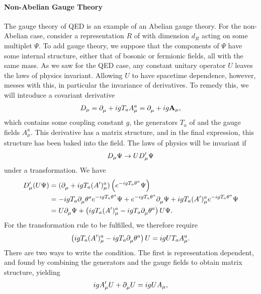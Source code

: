 \paragraph{Non-Abelian Gauge Theory}
The gauge theory of QED is an example of an Abelian gauge theory. For the non-Abelian case, consider a representation $R$ of  with dimension $d_{R}$ acting on some multiplet $\Psi$. To add gauge theory, we suppose that the components of $\Psi$ have some internal structure, either that of bosonic or fermionic fields, all with the same mass. As we saw for the QED case, any constant unitary operator $U$ leaves the laws of physics invariant. Allowing $U$ to have spacetime dependence, however, messes with this, in particular the invariance of derivatives. To remedy this, we will introduce a covariant derivative
\begin{align*}
	D_{\mu} = \partial^{}_{\mu} + igT_{a}A_{\mu}^{a} = \partial^{}_{\mu} + ig\textbf{A}_{\mu},
\end{align*}
which contains some coupling constant $g$, the generators $T_{a}$ of  and the gauge fields $A_{\mu}^{a}$. This derivative has a matrix structure, and in the final expression, this structure has been baked into the field. The laws of physics will be invariant if
\begin{align*}
	D_{\mu}\Psi \to UD_{\mu}^{\prime} \Psi
\end{align*}
under a transformation. We have
\begin{align*}
	D_{\mu}^{\prime}(U\Psi) &= (\partial^{}_{\mu} + igT_{a}(A^{\prime})_{\mu}^{a})\left(e^{-igT_{a}\theta^{a}}\Psi\right) \\
	               &= -igT_{a}\partial^{}_{\mu}\theta^{a}e^{-igT_{a}\theta^{a}}\Psi + e^{-igT_{a}\theta^{a}}\partial^{}_{\mu}\Psi + igT_{a}(A^{\prime})_{\mu}^{a}e^{-igT_{a}\theta^{a}}\Psi \\
	               &= U\partial^{}_{\mu}\Psi + \left(igT_{a}(A^{\prime})_{\mu}^{a} - igT_{a}\partial^{}_{\mu}\theta^{a}\right)U\Psi.
\end{align*}
For the transformation rule to be fulfilled, we therefore require
\begin{align*}
	\left(igT_{a}(A^{\prime})_{\mu}^{a} - igT_{a}\partial^{}_{\mu}\theta^{a}\right)U = igUT_{a}A_{\mu}^{a}.
\end{align*}
There are two ways to write the condition. The first is representation dependent, and found by combining the generators and the gauge fields to obtain matrix structure, yielding
\begin{align*}
	igA^{\prime}_{\mu}U + \partial^{}_{\mu}U = igUA_{\mu},
\end{align*}
